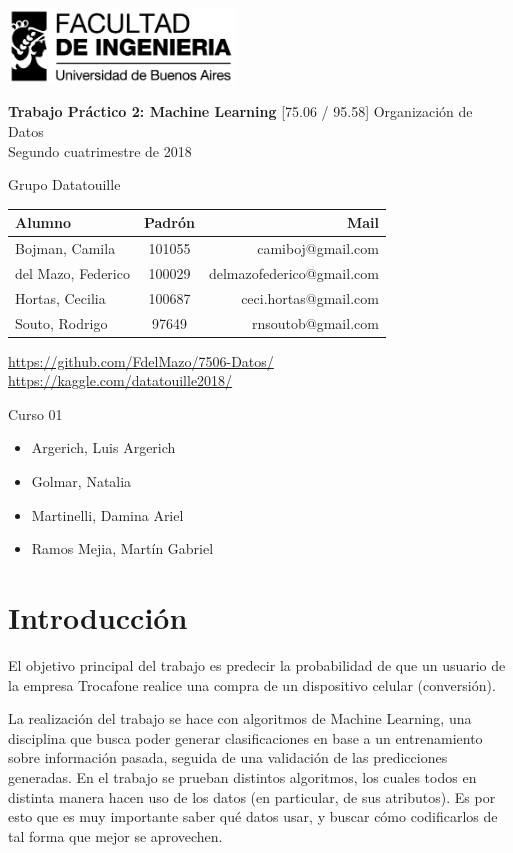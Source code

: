 \documentclass[a4paper]{article}
\makeatletter
\newcommand{\materia}{[75.06 / 95.58] Organización de Datos}
\newcommand{\trabajo}{Trabajo Práctico 2: Machine Learning}
\newcommand{\cuatrimestre}{Segundo cuatrimestre de 2018}
\newcommand{\grupo}{Grupo Datatouille}
\newcommand{\repo}{https://github.com/FdelMazo/7506-Datos/}
\newcommand{\kernel}{https://kaggle.com/datatouille2018/}
\newcommand{\alumnos}{
    Bojman, Camila & 101055 &  camiboj@gmail.com\\
    del Mazo, Federico & 100029 & delmazofederico@gmail.com\\
    Hortas, Cecilia & 100687 & ceci.hortas@gmail.com\\
    Souto, Rodrigo & 97649 & rnsoutob@gmail.com\\
}
\newcommand{\curso}{Curso 01}
\newcommand{\docentes}{
    \item Argerich, Luis Argerich
    \item Golmar, Natalia
    \item Martinelli, Damina Ariel
    \item Ramos Mejia, Martín Gabriel
}
\makeatother
\begin{document}

\begin{titlepage}
	\hfill\includegraphics[width=6cm]{fiuba.jpg}
    \begin{center}
    \vfill
    \Huge \textbf{\trabajo}
    \vskip2cm
    \Large \materia\\
    \cuatrimestre
    \vfill
    \begin{flushleft} 
    \grupo
    \end{flushleft}
    \begin{tabular}{|l|c|r|}
	\hline
	Alumno & Padrón & Mail\\
	\hline \hline
    \alumnos
	\hline
	\end{tabular}
    \begin{flushleft} 
    \large{\url{\repo}} \\
    \large{\url{\kernel}} \\
    \end{flushleft}
    \vskip1cm
    \end{center}
    \curso
    \begin{itemize}
        \docentes
    \end{itemize}
\end{titlepage}
\tableofcontents
\newpage
{}
\setcounter{page}{1}

\section{Introducción}

El objetivo principal del trabajo es predecir la probabilidad de que un usuario de la empresa Trocafone realice una compra de un dispositivo celular (conversión). 

La realización del trabajo se hace con algoritmos de Machine Learning, una disciplina que busca poder generar clasificaciones en base a un entrenamiento sobre información pasada, seguida de una validación de las predicciones generadas. En el trabajo se prueban distintos algoritmos, los cuales todos en distinta manera hacen uso de los datos (en particular, de sus atributos). Es por esto que es muy importante saber qué datos usar, y buscar cómo codificarlos de tal forma que mejor se aprovechen.
\end{document}
